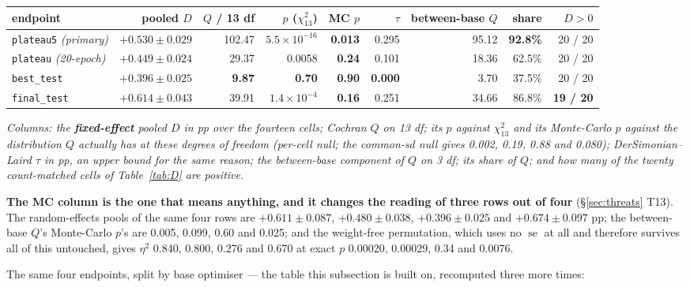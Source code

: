\documentclass[10pt,letterpaper]{article}
\newcommand{\Dstat}{D}                         %
\newcommand{\plateau}{\texttt{plateau5}}
\DeclareMathOperator{\se}{se}
\begin{document}
\begin{center}
\footnotesize
\begin{tabular}{@{}lrrrrrrrr@{}}
\toprule
endpoint & pooled $\Dstat$ & $Q$ / 13 df & $p$ ($\chi^2_{13}$) & MC $p$ & $\tau$ &
  between-base $Q$ & share & $\Dstat > 0$ \\
\midrule
\plateau{} \emph{(primary)}         & $+0.530 \pm 0.029$ & 102.47 & $5.5\times10^{-16}$ & \textbf{0.013} & 0.295 & 95.12 & \textbf{92.8\%} & 20 / 20 \\
\texttt{plateau} \emph{(20-epoch)}  & $+0.449 \pm 0.024$ &  29.37 & 0.0058              & \textbf{0.24}  & 0.101 & 18.36 & 62.5\%          & 20 / 20 \\
\texttt{best\_test}                 & $+0.396 \pm 0.025$ &   \textbf{9.87} & \textbf{0.70} & \textbf{0.90} & \textbf{0.000} & 3.70 & 37.5\% & 20 / 20 \\
\texttt{final\_test}                & $+0.614 \pm 0.043$ &  39.91 & $1.4\times10^{-4}$  & \textbf{0.16}  & 0.251 & 34.66 & 86.8\%          & \textbf{19 / 20} \\
\bottomrule
\end{tabular}
\end{center}
\noindent\emph{Columns: the \textbf{fixed-effect} pooled $\Dstat$ in pp over the fourteen
cells; Cochran $Q$ on 13 df; its $p$ against $\chi^2_{13}$ and its Monte-Carlo $p$ against the
distribution $Q$ actually has at these degrees of freedom (per-cell null; the common-sd null
gives 0.002, 0.19, 0.88 and 0.080); DerSimonian--Laird $\tau$ in pp, an upper bound for the same
reason; the between-base component of $Q$ on 3 df; its share of $Q$; and how many of the twenty
count-matched cells of Table~\ref{tab:D} are positive.}

\noindent \textbf{The MC column is the one that means anything, and it changes the reading of
three rows out of four} (\S\ref{sec:threats} T13). The random-effects pools of the same four
rows are $+0.611 \pm 0.087$, $+0.480 \pm 0.038$, $+0.396 \pm 0.025$ and $+0.674 \pm 0.097$ pp;
the between-base $Q$'s Monte-Carlo $p$'s are 0.005, 0.099, 0.60 and 0.025; and the weight-free
permutation, which uses no $\se$ at all and therefore survives all of this untouched, gives
$\eta^2$ 0.840, 0.800, 0.276 and 0.670 at exact $p$ 0.00020, 0.00029, 0.34 and 0.0076.

\noindent The same four endpoints, split by base optimiser --- the table this subsection is built
on, recomputed three more times:
\end{document}
